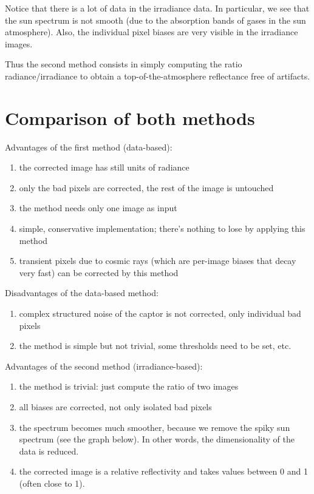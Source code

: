 \documentclass[a4paper]{article}    %
\theoremstyle{note}
\theoremstyle{plain}
\begin{document}
Notice that there is a lot of data in the irradiance data.  In particular,
we see that the sun spectrum is not smooth (due to the absorption bands of
gases in the sun atmosphere).  Also, the individual pixel biases are very
visible in the irradiance images.

Thus the second method consists in simply computing the ratio
radiance/irradiance to obtain a top-of-the-atmosphere reflectance free of
artifacts.

\clearpage
\section{Comparison of both methods}

Advantages of the first method (data-based):

\begin{enumerate}
	\item the corrected image has still units of radiance
	\item only the bad pixels are corrected, the rest of the image is untouched
	\item the method needs only one image as input
	\item simple, conservative implementation; there's nothing to lose by
		applying this method
	\item transient pixels due to cosmic rays (which are per-image biases that
		decay very fast) can be corrected by this method
\end{enumerate}

Disadvantages of the data-based method:

\begin{enumerate}
	\item complex structured noise of the captor is not corrected, only
		individual bad pixels
	\item the method is simple but not trivial, some thresholds need to be set,
		etc.
\end{enumerate}


Advantages of the second method (irradiance-based):

\begin{enumerate}
	\item the method is trivial: just compute the ratio of two images
	\item all biases are corrected, not only isolated bad pixels
	\item the spectrum becomes much smoother, because we remove the spiky sun
		spectrum (see the graph below).  In other words, the dimensionality of
		the data is reduced.
	\item the corrected image is a relative reflectivity and takes values
		between 0 and 1 (often close to 1).
\end{enumerate}
\end{document}
